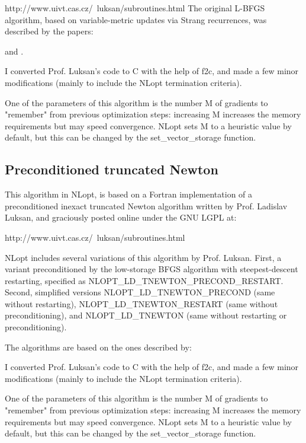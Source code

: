 http://www.uivt.cas.cz/~luksan/subroutines.html 
The original L-BFGS algorithm, based on variable-metric updates via Strang recurrences, was described by the papers: 

\cite{Nocedal_1980} and \cite{Liu_1989}.


I converted Prof. Luksan's code to C with the help of f2c, and made a few minor modifications (mainly to include the NLopt termination criteria). 

One of the parameters of this algorithm is the number M of gradients to "remember" from previous optimization steps: increasing M increases the memory requirements but may speed convergence. NLopt sets M to a heuristic value by default, but this can be changed by the set\_vector\_storage function. 





\subsection{Preconditioned truncated Newton}
This algorithm in NLopt, is based on a Fortran implementation of a preconditioned inexact truncated Newton algorithm written by Prof. Ladislav Luksan, and graciously posted online under the GNU LGPL at: 

http://www.uivt.cas.cz/~luksan/subroutines.html 

NLopt includes several variations of this algorithm by Prof. Luksan. First, a variant preconditioned by the low-storage BFGS algorithm with steepest-descent restarting, specified as NLOPT\_LD\_TNEWTON\_PRECOND\_RESTART. Second, simplified versions NLOPT\_LD\_TNEWTON\_PRECOND (same without restarting), NLOPT\_LD\_TNEWTON\_RESTART (same without preconditioning), and NLOPT\_LD\_TNEWTON (same without restarting or preconditioning). 

The algorithms are based on the ones described by: \cite{Dembo_1982}

I converted Prof. Luksan's code to C with the help of f2c, and made a few minor modifications (mainly to include the NLopt termination criteria). 

One of the parameters of this algorithm is the number M of gradients to "remember" from previous optimization steps: increasing M increases the memory requirements but may speed convergence. NLopt sets M to a heuristic value by default, but this can be changed by the set\_vector\_storage function. 





